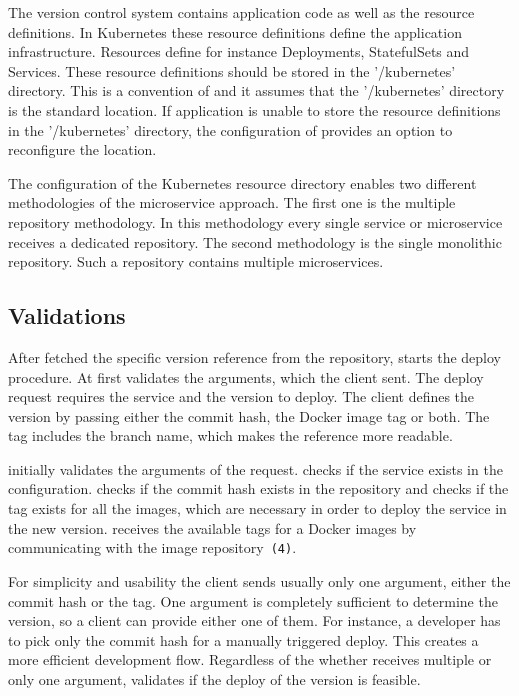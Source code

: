 The version control system contains application code as well as the resource
definitions. In Kubernetes these resource definitions define the application
infrastructure. Resources define for instance Deployments, StatefulSets and
Services. These resource definitions should be stored in the '/kubernetes' directory. This
is a convention of \deployer{} and it assumes that the '/kubernetes' directory is the
standard location. If application is unable to store the resource definitions in the
'/kubernetes' directory, the configuration of \deployer{} provides an option to reconfigure
the location.

The configuration of the Kubernetes resource directory enables two different methodologies
of the microservice approach. The first one is the multiple repository methodology. In
this methodology every single service or microservice receives a dedicated repository.
The second methodology is the single monolithic repository. Such a repository contains
multiple microservices.

\subsection{Validations}

After \deployer{} fetched the specific version reference from the repository, \deployer{} starts
the deploy procedure. At first \deployer{} validates the arguments, which the client
sent. The deploy request requires the service and the version to deploy. The client
defines the version by passing either the commit hash, the Docker image tag or both. The
tag includes the branch name, which makes the reference more readable.

\deployer{} initially validates the arguments of the request. \deployer{} checks if the service
exists in the configuration. \deployer{} checks if the commit hash exists in the repository
and \deployer{} checks if the tag exists for all the images, which are necessary in order to
deploy the service in the new version. \deployer{} receives the available tags for a Docker
images by communicating with the image repository~\texttt{(4)}.

For simplicity and usability the client sends usually only one argument, either the commit
hash or the tag. One argument is completely sufficient to determine the version, so a
client can provide either one of them. For instance, a developer has to pick only the
commit hash for a manually triggered deploy. This creates a more efficient development
flow. Regardless of the whether \deployer{} receives multiple or only one argument, \deployer{}
validates if the deploy of the version is feasible.


